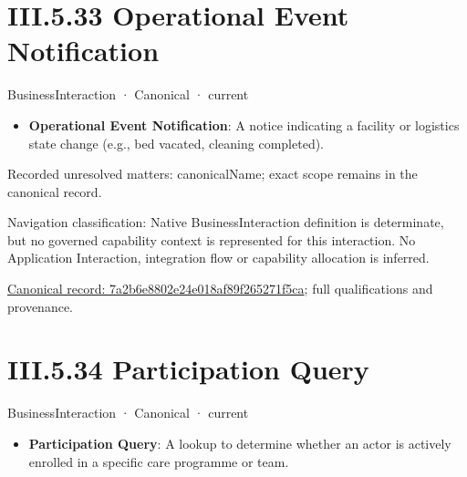 \section*{III.5.33 Operational Event Notification}
\label{navigation:III.5.33}

\label{element:7a2b6e8802e24e018af89f265271f5ca}
{\small BusinessInteraction · Canonical · current}\par

\begin{itemize}


\item \textbf{Operational Event Notification}: A notice indicating a facility or logistics state change (e.g., bed vacated, cleaning completed).

\end{itemize}

{\small Recorded unresolved matters: canonicalName; exact scope remains in the canonical record.}\par
{\small Navigation classification: Native BusinessInteraction definition is determinate, but no governed capability context is represented for this interaction. No Application Interaction, integration flow or capability allocation is inferred.}\par
{\footnotesize \href{../../../../continuum/business/business-interaction/7a2b6e8802e24e018af89f265271f5ca.md}{Canonical record: 7a2b6e8802e24e018af89f265271f5ca}; full qualifications and provenance.}\par
\section*{III.5.34 Participation Query}
\label{navigation:III.5.34}

\label{element:1ce0ba25408c47f9bd82953fba605c40}
{\small BusinessInteraction · Canonical · current}\par

\begin{itemize}


\item \textbf{Participation Query}: A lookup to determine whether an actor is actively enrolled in a specific care programme or team.

\end{itemize}

